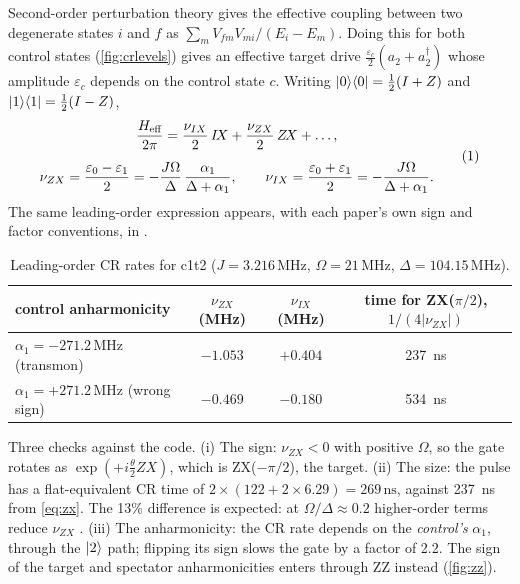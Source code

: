 \documentclass[11pt,a4paper]{article}
\DeclareRobustCommand{\code}[1]{\texttt{\detokenize{#1}}}
\newcommand{\ad}{a^{\dagger}}
\newcommand{\MHz}{\,\mathrm{MHz}}
\newcommand{\ns}{\,\mathrm{ns}}
\newcommand{\eqlab}[1]{\refstepcounter{equation}\tag{\theequation}\label{#1}}
\begin{document}
Second-order perturbation theory gives the effective coupling between two degenerate states \(i\) and \(f\) as
\(\sum_m V_{fm}V_{mi}/(E_i - E_m)\). Doing this for both control states (\cref{fig:crlevels}) gives an effective target drive
\(\tfrac{\varepsilon_c}{2}(a_2+\ad_2)\) whose amplitude \(\varepsilon_c\) depends on the control state \(c\). Writing
\(\ket{0}\!\bra{0} = \tfrac12(I+Z)\) and \(\ket{1}\!\bra{1} = \tfrac12(I-Z)\),
\[
\begin{gathered}
\frac{H_{\text{eff}}}{2\pi} = \frac{\nu_{IX}}{2}\,I\!X + \frac{\nu_{ZX}}{2}\,Z\!X + \dots,\\[0.5em]
\nu_{ZX} = \frac{\varepsilon_0-\varepsilon_1}{2} = -\frac{J\Omega}{\Delta}\,\frac{\alpha_1}{\Delta+\alpha_1},\qquad
\nu_{IX} = \frac{\varepsilon_0+\varepsilon_1}{2} = -\frac{J\Omega}{\Delta+\alpha_1}.
\end{gathered}
\eqlab{eq:zx}
\]
The same leading-order expression appears, with each paper's own sign and factor conventions, in
\cite{magesan2020,tripathi2019,malekakhlagh2020}.

\begin{table}[htbp]
\centering\small
\caption{Leading-order CR rates for c1t2 (\(J = 3.216\MHz\), \(\Omega = 21\MHz\), \(\Delta = 104.15\MHz\)).}
\label{tab:cr}
\begin{tabular}{@{}l c c c@{}}
\toprule
control anharmonicity & \(\nu_{ZX}\) (MHz) & \(\nu_{IX}\) (MHz) & time for ZX(\(\pi/2\)), \(1/(4|\nu_{ZX}|)\) \\
\midrule
\(\alpha_1 = -271.2\MHz\) (transmon) & \(-1.053\) & \(+0.404\) & 237~ns \\
\(\alpha_1 = +271.2\MHz\) (wrong sign) & \(-0.469\) & \(-0.180\) & 534~ns \\
\bottomrule
\end{tabular}
\end{table}

Three checks against the code. (i) The sign: \(\nu_{ZX}<0\) with positive \(\Omega\), so the gate rotates as
\(\exp(+i\tfrac{\theta}{2}Z\!X)\), which is ZX(\(-\pi/2\)), the \code{zx_m90} target. (ii) The size: the pulse has a
flat-equivalent CR time of \(2\times(122 + 2\times 6.29) = 269\ns\), against 237~ns from \cref{eq:zx}. The 13\%
difference is expected: at \(\Omega/\Delta\approx0.2\) higher-order terms reduce \(\nu_{ZX}\) \cite{magesan2020}. (iii) The
anharmonicity: the CR rate depends on the \emph{control's} \(\alpha_1\), through the \(\ket{2}\) path; flipping its sign
slows the gate by a factor of 2.2. The sign of the target and spectator anharmonicities enters through ZZ instead
(\cref{fig:zz}).
\end{document}

